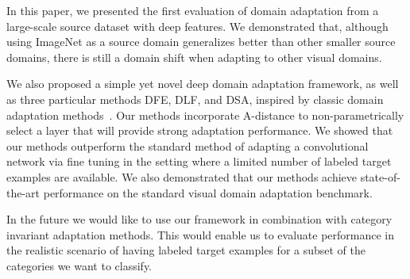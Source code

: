In this paper, we presented the first evaluation of domain adaptation from a
large-scale source dataset with deep features. We demonstrated that, although
using ImageNet as a source domain generalizes better than other smaller source
domains, there is still a domain shift when adapting to other visual domains.

We also proposed a simple yet novel deep domain adaptation framework, as well as
three particular methods DFE, DLF, and DSA, inspired by classic domain
adaptation methods~\cite{daume, sa}. Our methods incorporate A-distance to
non-parametrically select a layer that will provide strong adaptation
performance. We showed that our methods outperform the standard method of
adapting a convolutional network via fine tuning in the setting where a limited
number of labeled target examples are available. We also demonstrated that our
methods achieve state-of-the-art performance on the standard visual domain
adaptation benchmark.

In the future we would like to use our framework in combination with category invariant adaptation methods. This would enable us to evaluate performance in the realistic scenario of having labeled target examples for a subset of the categories we want to classify. 
